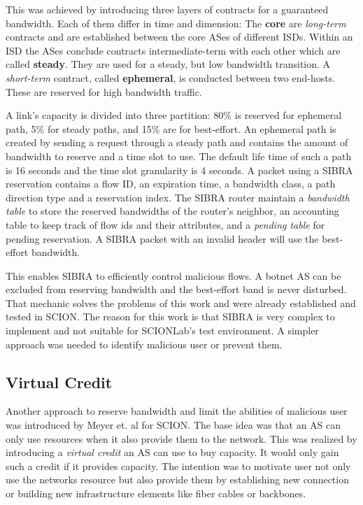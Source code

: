 \documentclass[thesis.tex]{subfiles}
\begin{document}
This was achieved by introducing three layers of contracts for a guaranteed bandwidth. Each of them differ in time and dimension: The \textbf{core} are \textit{long-term} contracts and are established between the core ASes of different ISDs. Within an ISD the ASes conclude contracts intermediate-term with each other which are called \textbf{steady}. They are used for a steady, but low bandwidth transition. A \textit{short-term} contract, called \textbf{ephemeral}, is conducted between two end-hosts. These are reserved for high bandwidth traffic. 

A link's capacity is divided into three partition: 80\% is reserved for ephemeral path, 5\% for steady paths, and 15\% are for best-effort. An ephemeral path is created by sending a request through a steady path and contains the amount of bandwidth to reserve and a time slot to use. The default life time of such a path is 16 seconds and the time slot granularity is 4 seconds. A packet using a SIBRA reservation contains a flow ID, an expiration time, a bandwidth class, a path direction type and a reservation index. The SIBRA router maintain a \textit{bandwidth table} to store the reserved bandwidths of the router's neighbor, an accounting table to keep track of flow ids and their attributes, and a \textit{pending table} for pending reservation. A SIBRA packet with an invalid header will use the best-effort bandwidth.

This enables SIBRA to efficiently control malicious flows. A botnet AS can be excluded from reserving bandwidth and the best-effort band is never disturbed. That mechanic solves the problems of this work and were already established and tested in SCION. The reason for this work is that SIBRA is very complex to implement and not suitable for SCIONLab's test environment. A simpler approach was needed to identify malicious user or prevent them.

\subsection{Virtual Credit} \cite{Meyer.2017}
Another approach to reserve bandwidth and limit the abilities of malicious user was introduced by Meyer et. al for SCION. The base idea was that an AS can only use resources when it also provide them to the network. This was realized by introducing a \textit{virtual credit} an AS can use to buy capacity. It would only gain such a credit if it provides capacity. The intention was to motivate user not only use the networks resource but also provide them by establishing new connection or building new infrastructure elements like fiber cables or backbones.
\end{document}
